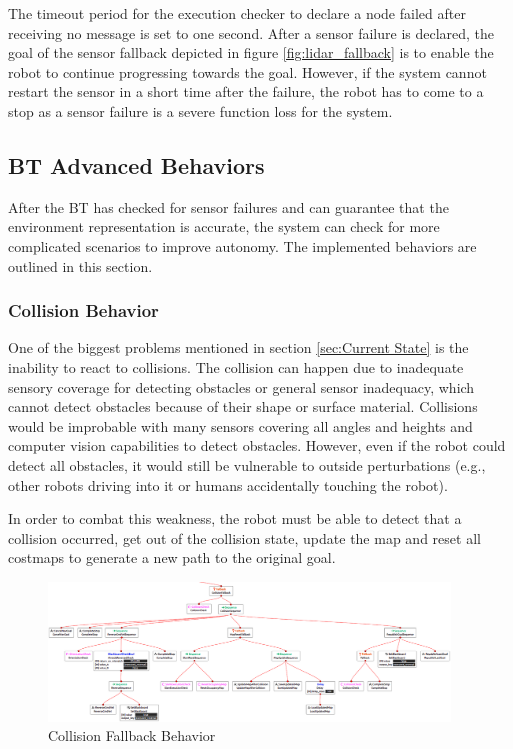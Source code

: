 The timeout period for the execution checker to declare a node failed after receiving no message is set to one second. After a sensor failure is declared, the goal of the sensor fallback depicted in figure \ref{fig:lidar_fallback} is to enable the robot to continue progressing towards the goal. However, if the system cannot restart the sensor in a short time after the failure, the robot has to come to a stop as a sensor failure is a severe function loss for the system.

\subsection{BT Advanced Behaviors}

After the BT has checked for sensor failures and can guarantee that the environment representation is accurate, the system can check for more complicated scenarios to improve autonomy. The implemented behaviors are outlined in this section. 

\subsubsection{Collision Behavior}

One of the biggest problems mentioned in section \ref{sec:Current State} is the inability to react to collisions. The collision can happen due to inadequate sensory coverage for detecting obstacles or general sensor inadequacy, which cannot detect obstacles because of their shape or surface material. Collisions would be improbable with many sensors covering all angles and heights and computer vision capabilities to detect obstacles. However, even if the robot could detect all obstacles, it would still be vulnerable to outside perturbations (e.g., other robots driving into it or humans accidentally touching the robot). 

In order to combat this weakness, the robot must be able to detect that a collision occurred, get out of the collision state, update the map and reset all costmaps to generate a new path to the original goal. 

\begin{figure}[ht]
	\centering
	\includegraphics[width=0.95\textwidth]{images/collision_fallback_inverted.png}
	\caption{Collision Fallback Behavior}
	\label{fig:collision_fallback}
\end{figure}

